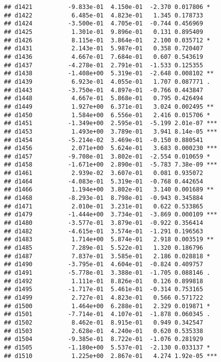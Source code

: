 \documentclass[
]{article}
\begin{document}
\begin{verbatim}
## d1421          -9.833e-01  4.150e-01  -2.370 0.017806 *  
## d1422           6.485e-01  4.823e-01   1.345 0.178733    
## d1424          -3.500e-01  4.705e-01  -0.744 0.456969    
## d1425           1.301e-01  9.896e-01   0.131 0.895409    
## d1426           8.115e-01  3.864e-01   2.100 0.035712 *  
## d1431           2.143e-01  5.987e-01   0.358 0.720407    
## d1436           4.667e-01  7.684e-01   0.607 0.543619    
## d1437          -4.278e-01  2.791e-01  -1.533 0.125355    
## d1438          -1.408e+00  5.319e-01  -2.648 0.008102 ** 
## d1439           6.923e-01  4.055e-01   1.707 0.087771 .  
## d1443          -3.750e-01  4.897e-01  -0.766 0.443847    
## d1448           4.667e-01  5.868e-01   0.795 0.426494    
## d1449           1.927e+00  6.371e-01   3.024 0.002495 ** 
## d1450           1.584e+00  6.556e-01   2.416 0.015706 *  
## d1451          -1.349e+00  2.595e-01  -5.199 2.01e-07 ***
## d1453           1.493e+00  3.789e-01   3.941 8.14e-05 ***
## d1454          -5.214e-02  3.469e-01  -0.150 0.880541    
## d1456           2.071e+00  5.624e-01   3.683 0.000230 ***
## d1457          -9.708e-01  3.802e-01  -2.554 0.010659 *  
## d1458          -1.671e+00  2.890e-01  -5.783 7.38e-09 ***
## d1461           2.939e-02  3.607e-01   0.081 0.935072    
## d1464          -4.083e-01  5.319e-01  -0.768 0.442654    
## d1466           1.194e+00  3.802e-01   3.140 0.001689 ** 
## d1468          -8.293e-01  8.798e-01  -0.943 0.345884    
## d1471           2.010e-01  3.231e-01   0.622 0.533865    
## d1479          -1.444e+00  3.734e-01  -3.869 0.000109 ***
## d1480          -3.577e-01  3.879e-01  -0.922 0.356414    
## d1482          -4.615e-01  3.574e-01  -1.291 0.196563    
## d1483           1.714e+00  5.874e-01   2.918 0.003519 ** 
## d1485           7.289e-01  5.522e-01   1.320 0.186796    
## d1487           7.837e-01  3.585e-01   2.186 0.028818 *  
## d1490          -3.795e-01  4.604e-01  -0.824 0.409757    
## d1491          -5.778e-01  3.388e-01  -1.705 0.088146 .  
## d1492           1.111e-01  8.826e-01   0.126 0.899818    
## d1495          -1.717e-01  5.461e-01  -0.314 0.753165    
## d1499           2.727e-01  4.823e-01   0.566 0.571722    
## d1500           1.464e+00  6.288e-01   2.329 0.019871 *  
## d1501          -7.714e-01  4.107e-01  -1.878 0.060345 .  
## d1502           8.462e-01  8.915e-01   0.949 0.342547    
## d1503           2.628e-01  4.240e-01   0.620 0.535338    
## d1504          -9.385e-01  8.722e-01  -1.076 0.281929    
## d1505          -1.180e+00  5.537e-01  -2.130 0.033137 *  
## d1510           1.225e+00  2.867e-01   4.274 1.92e-05 ***

\end{verbatim}
\end{document}
